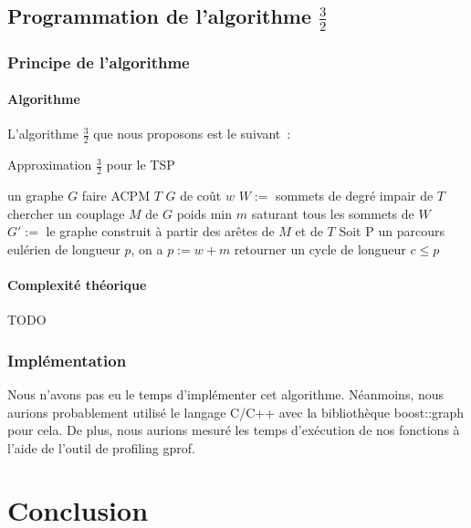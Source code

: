 \documentclass[a4paper, 12pt]{article}
\begin{document}
\subsection{Programmation de l'algorithme $\frac{3}{2}$}

\subsubsection{Principe de l'algorithme}

\paragraph{Algorithme}

L'algorithme $\frac{3}{2}$ que nous proposons est le suivant~:

\begin{algorithm}[!ht]
\caption{Approximation $\frac{3}{2}$ pour le TSP}
\label{3-2tsp}
\begin{algorithmic}[1]
\REQUIRE un graphe $G$
\STATE faire ACPM $T$ $G$ de coût $w$
\STATE $W := $ sommets de degré impair de $T$
\STATE chercher un couplage $M$ de $G$ poids min $m$ saturant tous les
sommets de $W$
\STATE $G' := $ le graphe construit à partir des arêtes de $M$ et de
$T$
\STATE Soit P un parcours eulérien de longueur $p$, on a $p:= w + m$
\STATE retourner un cycle de longueur $c \leq p$
\end{algorithmic}
\end{algorithm}

\paragraph{Complexité théorique}

TODO

\subsubsection{Implémentation}

Nous n'avons pas eu le temps d'implémenter cet algorithme. Néanmoins,
nous aurions probablement utilisé le langage C/C++ avec la
bibliothèque boost::graph pour cela. De plus, nous aurions mesuré les
temps d'exécution de nos fonctions à l'aide de l'outil de profiling gprof.

\section{Conclusion}
\end{document}
